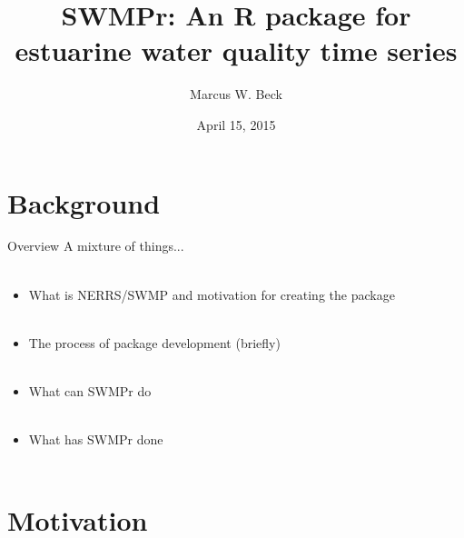 \documentclass[serif]{beamer}\usepackage[]{graphicx}\usepackage[]{color}
\begin{document}
\title[SWMPr for estuarine time series]{SWMPr: An R package for estuarine water quality time series}

\author[M. Beck]{Marcus W. Beck}

\date{April 15, 2015}



\begin{frame}
\titlepage
\end{frame}

\section{Background}

\begin{frame}{Overview}
A mixture of things...\\~\\
\begin{itemize}
\item What is NERRS/SWMP and motivation for creating the package \\~\\
\item The process of package development (briefly) \\~\\
\item What can SWMPr do \\~\\
\item What has SWMPr done \\~\\
\end{itemize}
\end{frame}

\section{Motivation}
\end{document}
